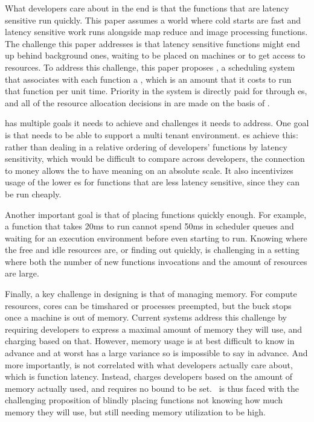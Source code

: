 What developers care about in the end is that the functions that are latency
sensitive run quickly. This paper assumes a world where cold starts are fast and
latency sensitive work runs alongside map reduce and image processing functions.
The challenge this paper addresses is that latency sensitive functions might end
up behind background ones, waiting to be placed on machines or to get access to
resources. To address this challenge, this paper proposes \sys{}, a scheduling
system that associates with each function a \textit{\priceclass{}}, which is an
amount that it costs to run that function per unit time. Priority in the system
is directly paid for through \priceclass{}es, and all of the resource allocation
decisions in \sys{} are made on the basis of \priceclass{}.

\Sys{} has multiple goals it needs to achieve and challenges it needs to
address. One goal is that \sys{} needs to be able to support a multi tenant
environment. \Priceclass{}es achieve this: rather than dealing in a relative
ordering of developers' functions by latency sensitivity, which would be
difficult to compare across developers, the connection to money allows the
\class{} to have meaning on an absolute scale. It also incentivizes usage of the
lower \class{}es for functions that are less latency sensitive, since they can
be run cheaply.


Another important goal is that of placing functions quickly enough. For example,
a function that takes 20ms to run cannot spend 50ms in scheduler queues and
waiting for an execution environment before even starting to run. Knowing where
the free and idle resources are, or finding out quickly, is challenging in a
setting where both the number of new functions invocations and the amount of
resources are large.


Finally, a key challenge in designing \sys{} is that of managing memory. For
compute resources, cores can be timshared or processes preempted, but the buck
stops once a machine is out of memory. Current systems address this challenge by
requiring developers to express a maximal amount of memory they will use, and
charging based on that. However, memory usage is at best difficult to know in
advance and at worst has a large variance so is impossible to say in advance.
And more importantly, is not correlated with what developers actually care
about, which is function latency. Instead, \sys{} charges developers based on
the amount of memory actually used, and requires no bound to be set.~\Sys{} is
thus faced with the challenging proposition of blindly placing functions not
knowing how much memory they will use, but still needing memory utilization to
be high.
 

